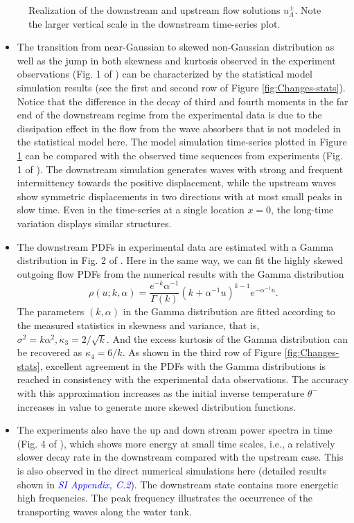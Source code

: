 \documentclass[9pt,twocolumn,twoside,lineno]{pnas-new}
\begin{document}
\begin{figure}[h]
\vspace{-1em}
\caption{Realization of the downstream and upstream flow solutions $u_{\Lambda}^{\pm}$. Note the larger vertical scale in the downstream time-series plot.\label{fig:Realization}}
\end{figure}
\begin{itemize}
\item The transition from near-Gaussian to skewed non-Gaussian distribution
as well as the jump in both skewness and kurtosis observed in the
experiment observations (Fig. 1 of  \cite{bolles2018anomalous}) can
be characterized by the statistical model simulation results (see
the first and second row of Figure \ref{fig:Changes-stats}). Notice
that the difference in the decay of third and fourth moments in the far
end of the downstream regime from the experimental data is due to the
dissipation effect in the flow from the wave absorbers that is not modeled in the statistical
model here. The model simulation time-series plotted in Figure \ref{fig:Realization}
can be compared with the observed time sequences from experiments
(Fig. 1 of \cite{bolles2018anomalous}). The downstream simulation generates
waves with strong and frequent intermittency towards the positive
displacement, while the upstream waves show symmetric displacements
in two directions with at most small peaks in slow time. Even in the
time-series at a single location $x=0$, the long-time variation displays similar
structures. 
\item The downstream PDFs in experimental data are estimated with a Gamma
distribution in Fig. 2 of \cite{bolles2018anomalous}. Here in the same
way, we can fit the highly skewed outgoing flow PDFs from the numerical
results with the Gamma distribution
\[
\rho\left(u;k,\alpha\right)=\frac{e^{-k}\alpha^{-1}}{\Gamma\left(k\right)}\left(k+\alpha^{-1}u\right)^{k-1}e^{-\alpha^{-1}u}.
\]
The parameters $\left(k,\alpha\right)$ in the Gamma distribution
are fitted according to the measured statistics in skewness and variance,
that is, $\sigma^{2}=k\alpha^{2},\kappa_{3}=2/\sqrt{k}$. And the excess
kurtosis of the Gamma distribution can be recovered as $\kappa_{4}=6/k$.
As shown in the third row of Figure \ref{fig:Changes-stats}, excellent
agreement in the PDFs with the Gamma distributions
is reached in consistency with the experimental data observations.
The accuracy with this approximation increases as the initial inverse
temperature $\theta^{-}$ increases in value to generate more skewed
distribution functions.
\item The experiments also have the up and down stream power spectra in
time (Fig. 4 of \cite{bolles2018anomalous}), which shows more energy
at small time scales, i.e., a relatively slower decay rate in the
downstream compared with the upstream case. This is also observed
in the direct numerical simulations here (detailed results shown
in \textcolor{blue}{\emph{SI Appendix, C.2}}). The downstream state contains
more energetic high frequencies.
The peak frequency illustrates the occurrence of the transporting
waves along the water tank.


\end{itemize}
\end{document}
